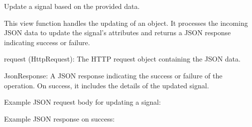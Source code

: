 \documentclass[letterpaper,10pt,english]{sphinxmanual}
\begin{document}
\begin{fulllineitems}
\label{\detokenize{app:app.views.update_signal}}
\pysigstartsignatures
{}
\pysigstopsignatures
\sphinxAtStartPar
Update a signal based on the provided data.

\sphinxAtStartPar
This view function handles the updating of an  object. 
It processes the incoming JSON data to update the signal’s attributes and returns a 
JSON response indicating success or failure.
\begin{description}
\sphinxAtStartPar
request (HttpRequest): The HTTP request object containing the JSON data.

\sphinxAtStartPar
JsonResponse: A JSON response indicating the success or failure of the operation. 
On success, it includes the details of the updated signal.

\sphinxAtStartPar
Example JSON request body for updating a signal:

\begin{sphinxVerbatim}[commandchars=\\\{\}]
\end{sphinxVerbatim}

\sphinxAtStartPar
Example JSON response on success:


\end{description}
\end{fulllineitems}
\end{document}
